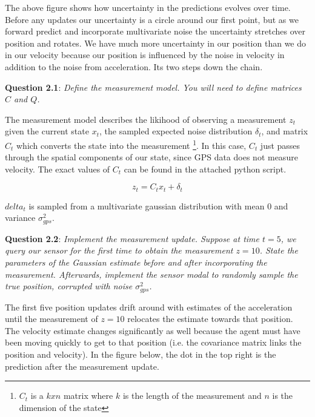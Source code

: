 \documentclass{article}
\begin{document}
The above figure shows how uncertainty in the predictions evolves over time. Before any updates our uncertainty is a circle around our first point, but as we forward predict and incorporate multivariate noise the uncertainty stretches over position and rotates. We have much more uncertainty in our position than we do in our velocity because our position is influenced by the noise in velocity in addition to the noise from acceleration. Its two steps down the chain.

{\bf Question 2.1}: \textit{Define the measurement model. You will need to define matrices $C$ and $Q$. \\}

The measurement model describes the likihood of observing a measurement $z_t$ given the current state $x_t$, the sampled expected noise distribution $\delta_t$, and matrix $C_t$ which converts the state into the measurement \footnote{$C_t$ is a $kxn$ matrix where $k$ is the length of the measurement and $n$ is the dimension of the state}. In this case, $C_t$ just passes through the spatial components of our state, since GPS data does not measure velocity. The exact values of $C_t$ can be found in the attached python script. 

\begin{equation}
    z_t = C_tx_t + \delta_t
\end{equation}

$delta_t$ is sampled from a multivariate gaussian distribution with mean 0 and variance $\sigma_{gps}^2$. 

{\bf Question 2.2}: \textit{Implement the measurement update. Suppose at time $t = 5$, we query our sensor for the first time to obtain the measurement $z = 10$. State the parameters of the Gaussian estimate before and after incorporating the measurement. Afterwards, implement the sensor modal to randomly sample the true position, corrupted with noise $\sigma_{gps}^2$. \\}

The first five position updates drift around with estimates of the acceleration until the measurement of $z=10$ relocates the estimate towards that position. The velocity estimate changes significantly as well because the agent must have been moving quickly to get to that position (i.e. the covariance matrix links the position and velocity). In the figure below, the dot in the top right is the prediction after the measurement update. 
\end{document}
